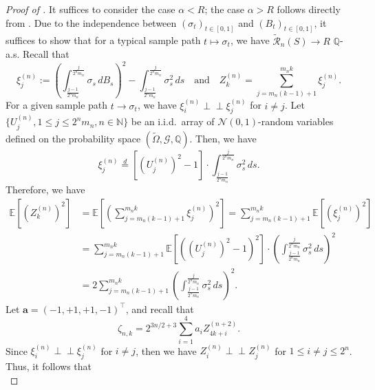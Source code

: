 \documentclass[12pt,reqno]{article}
\def\wt{\widetilde}
\numberwithin{equation}{section}
\def\cG{{\mathscr G}}
\def\cR{{\mathscr R}}
\theoremstyle{definition}
\def\wt#1{\widetilde{#1}}
\def\wt{\widetilde}
\newcommand{\indep}{\perp \!\!\! \perp}
\newcommand{\calN}{\mathcal{N}}
\newcommand{\bE}{\mathbb{E}}
\newcommand{\bN}{\mathbb{N}}
\newcommand{\bQ}{\mathbb{Q}}
\begin{document}
\begin{proof}[Proof of ]
	It suffices to consider the case $\alpha < R$; the  case $\alpha > R$ follows directly from . Due to the independence between $(\sigma_t)_{t \in [0,1]}$ and $(B_t)_{t \in [0,1]}$, it suffices to show that for a typical sample path $t \mapsto \sigma_t$, we have $\wt \cR_n(S) \rightarrow R$ $\bQ$-a.s. Recall that 
	\begin{equation*}
		\xi^{(n)}_{j} := \left(\int^{\frac{j}{2^n m_n}}_{\frac{j-1}{2^n m_n}}\sigma_s \,dB_s\right)^2 - \int^{\frac{j}{2^n m_n}}_{\frac{j-1}{2^n m_n}}\sigma^2_s\,ds \quad \text{and} \quad Z^{(n)}_k = \sum_{j = m_n(k-1)+1}^{m_n k}\xi^{(n)}_{j}.
	\end{equation*}
	For a given sample path $t \rightarrow \sigma_t$, we have $\xi^{(n)}_i \indep \xi^{(n)}_j$ for $i \neq j$. Let $\{U^{(n)}_{j}, 1 \le j \le 2^nm_n, n \in \bN\}$ be an i.i.d.~array of $\calN(0,1)$-random variables defined on the probability space $(\wt \Omega, \cG, \bQ)$. Then, we have 
	\begin{equation*}
		\xi^{(n)}_j \overset{d}{=} \left[\left(U^{(n)}_j\right)^2 - 1\right] \cdot \int^{\frac{j}{2^n m_n}}_{\frac{j-1}{2^n m_n}}\sigma^2_s\,ds.
	\end{equation*}
	Therefore, we have 
	\begin{equation}\label{eq Znk RV}
		\begin{split}
			\bE\left[\left(Z^{(n)}_{k}\right)^2\right] &= \bE\left[\left(\sum_{j = m_n(k-1)+1}^{m_n k} \xi^{(n)}_j\right)^2\right] = \sum_{j = m_n(k-1)+1}^{m_n k}\bE\left[\left(\xi^{(n)}_{j} \right)^2\right] \\&= \sum_{j = m_n(k-1)+1}^{m_n k}\bE\left[\left(\left(U^{(n)}_j\right)^2 - 1\right)^2\right]\cdot\left(\int^{\frac{j}{2^n m_n}}_{\frac{j-1}{2^n m_n}}\sigma^2_s\,ds\right)^2 \\&= 2 \sum_{j = m_n(k-1)+1}^{m_n k}\left(\int^{\frac{j}{2^n m_n}}_{\frac{j-1}{2^n m_n}}\sigma^2_s\,ds\right)^2.
		\end{split}
	\end{equation} 
	Let $\bm a = (-1,+1,+1,-1)^\top$, and recall that 
	\begin{equation*}
		\zeta_{n,k} = 2^{3n/2+3}\sum_{i = 1}^{4} a_i Z^{(n+2)}_{4k+i}.
	\end{equation*}
	Since $\xi^{(n)}_{i} \indep \xi^{(n)}_j$ for $i \neq j$, then we have $Z^{(n)}_i \indep Z^{(n)}_j$ for $1 \le i \neq j \le 2^n$. Thus, it follows that 
	\begin{equation*}

\end{equation*}
\end{proof}
\end{document}
